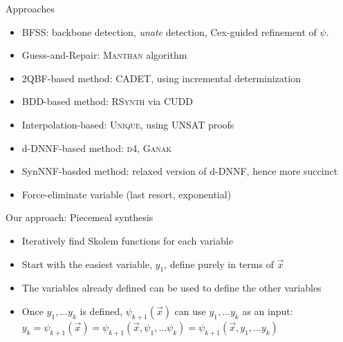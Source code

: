 \documentclass[aspectratio=169]{beamer}
\begin{document}
\begin{frame}{Approaches}
\begin{itemize}
    \item BFSS: backbone detection, \emph{unate} detection,
        Cex-guided refinement of $\psi$.
    \item Guess-and-Repair: \textsc{Manthan} algorithm
    \item 2QBF-based method: \textsc{CADET}, using incremental determinization
    \item BDD-based method: \textsc{RSynth} via \textsc{CUDD}
    \item Interpolation-based: \textsc{Unique}, using UNSAT proofs
    \item d-DNNF-based method: \textsc{d4}, \textsc{Ganak}
    \item SynNNF-basded method: relaxed version of d-DNNF, hence more succinct
    \item Force-eliminate variable (last resort, exponential)
\end{itemize}
\end{frame}

\begin{frame}{Our approach: Piecemeal synthesis}
\begin{itemize}
    \item Iteratively find Skolem functions for each variable
    \item Start with the easiest variable, $y_1$, define purely in terms of $\vec{x}$
    \item The variables already defined can be used to define the other variables
    \item Once $y_1, \ldots y_k$ is defined, $\psi_{k+1}(\vec{x})$ can use $y_1,\ldots y_k$ as an input:
        $y_k=\psi_{k+1}(\vec{x}) =
        \psi_{k+1}(\vec{x}, \psi_1, \ldots \psi_k) =
        \psi_{k+1}(\vec{x}, y_1, \ldots y_k)$
\end{itemize}
\end{frame}
\end{document}
